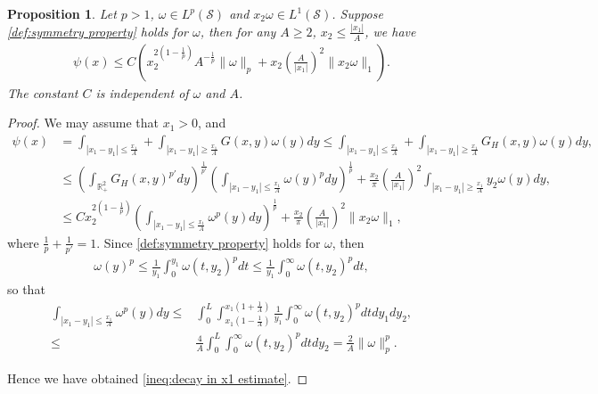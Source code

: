 \documentclass[11pt,letterpaper]{amsart}
\newtheorem{prop}[thm]{Proposition}
\theoremstyle{definition}
\theoremstyle{remark}
\renewcommand{\S}{\mathcal{S}}
\newcommand{\R}{\mathbb{R}}
\numberwithin{equation}{section}
\begin{document}
\begin{prop}\label{prop:decay in x1 estimate}
    Let $p>1$, $\omega\in L^p(\S)$ and $x_2 \omega \in L^1(\S)$. Suppose \eqref{def:symmetry property} holds for $\omega$, then for any $A\geq 2$, $x_2\leq \frac{|x_1|}{A}$, we have 
    \begin{align}
        \psi(x)\leq C\left( x_2^{2(1-\frac{1}{p})} A^{-\frac{1}{p}}\|\omega\|_p + x_2 \left( \frac{A}{|x_1|} \right)^2 \|x_2\omega\|_1 \right).\label{ineq:decay in x1 estimate}
    \end{align}
    The constant $C$ is independent of $\omega$ and $A$.
\end{prop}
\begin{proof}
We may assume that $x_1>0$, and 
\begin{align*}
    \psi(x) & =\int_{|x_1-y_1|\leq \frac{x_1}{A}} + \int_{|x_1-y_1|\geq \frac{x_1}{A}} G(x,y)\omega(y)dy \leq \int_{|x_1-y_1|\leq \frac{x_1}{A}} + \int_{|x_1-y_1|\geq \frac{x_1}{A}} G_H(x,y)\omega(y)dy, \\
    & \leq \left( \int_{\R^2_+} G_H(x,y)^{p'} dy \right)^\frac{1}{p'} \left( \int_{|x_1-y_1|\leq \frac{x_1}{A}} \omega(y)^{p} dy \right)^\frac{1}{p} + \frac{x_2}{\pi}\left( \frac{A}{|x_1|} \right)^2 \int_{|x_1-y_1|\geq \frac{x_1}{A}} y_2\omega(y)dy, \\
    & \leq Cx_2^{2(1-\frac{1}{p})} \left( \int_{|x_1-y_1|\leq \frac{x_1}{A}} \omega^{p}(y)dy \right)^\frac{1}{p} + \frac{x_2}{\pi}\left( \frac{A}{|x_1|} \right)^2 \|x_2\omega\|_1,
\end{align*}
where $\frac{1}{p}+\frac{1}{p'}=1$. Since \eqref{def:symmetry property} holds for $\omega$, then
\begin{align*}
    \omega(y)^p \leq \frac{1}{y_1}\int_0^{y_1} \omega(t,y_2)^p dt \leq \frac{1}{y_1}\int_0^{\infty} \omega(t,y_2)^p dt,
\end{align*}
so that
\begin{align*}
    \int_{|x_1-y_1| \leq \frac{x_1}{A}} \omega^{p}(y)dy 
    \leq & \int_{0}^L \int_{x_1(1-\frac{1}{A})}^{x_1(1+\frac{1}{A})} \frac{1}{y_1} \int_0^{\infty} \omega(t,y_2)^p dt dy_1 dy_2,\\
    \leq & \frac{4}{A} \int_{0}^L \int_0^{\infty} \omega(t,y_2)^p dt dy_2 = \frac{2}{A} \|\omega\|_p^p.
\end{align*}

Hence we have obtained \eqref{ineq:decay in x1 estimate}.
    
\end{proof}
\end{document}
